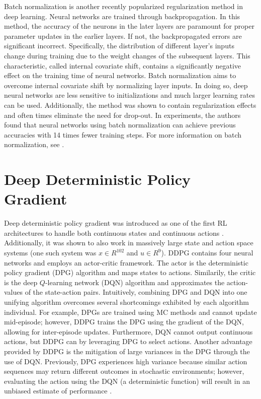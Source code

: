 Batch normalization is another recently popularized regularization method in deep learning.  Neural networks are trained through backpropagation.  In this method, the accuracy of the neurons in the later layers are paramount for proper parameter updates in the earlier layers.  If not, the backpropagated errors are significant incorrect. Specifically, the distribution of different layer's inputs change during training due to the weight changes of the subsequent layers. This characteristic, called internal covariate shift, contains a significantly negative effect on the training time of neural networks.  Batch normalization aims to overcome internal covariate shift by normalizing layer inputs.  In doing so, deep neural networks are less sensitive to initializations and much larger learning rates can be used. Additionally, the method was shown to contain regularization effects and often times eliminate the need for drop-out.  In experiments, the authors found that neural networks using batch normalization can achieve previous accuracies with 14 times fewer training steps.  For more information on batch normalization, see \cite{batch_norm}.





\section{Deep Deterministic Policy Gradient}
Deep deterministic policy gradient was introduced as one of the first RL architectures to handle both continuous states and continuous actions \cite{ddpg}. Additionally, it was shown to also work in massively large state and action space systems (one such system was $x \in R^{102}$ and $u \in R^{9}$). DDPG contains four neural networks and employs an actor-critic framework.  The actor is the deterministic policy gradient (DPG) algorithm and maps states to actions.  Similarily, the critic is the deep $Q$-learning network (DQN) algorithm and approximates the action-values of the state-action pairs. Intuitively, combining DPG and DQN into one unifying algorithm overcomes several shortcomings exhibited by each algorithm individual. For example, DPGs are trained using MC methods and cannot update mid-episode; however, DDPG trains the DPG using the gradient of the DQN, allowing for inter-episode updates. Furthermore, DQN cannot output continuous actions, but DDPG can by leveraging DPG to select actions.  Another advantage provided by DDPG is the mitigation of large variances in the DPG through the use of DQN.  Previously, DPG experiences high variance because similar action sequences may return different outcomes in stochastic environments; however, evaluating the action using the DQN (a deterministic function) will result in an unbiased estimate of performance \cite{ddpg}.  

